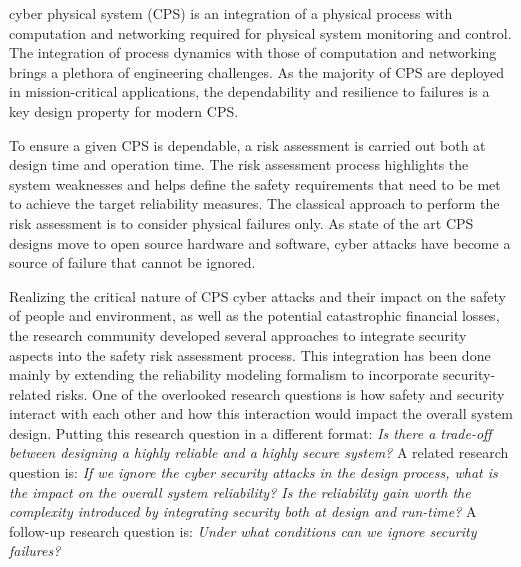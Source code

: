 \documentclass[journal]{IEEEtran}
\begin{document}
% 
% 
% 
% 
 cyber physical system (CPS) is an integration of a physical process with computation and networking required for physical system monitoring and control. The integration of process dynamics with those of computation and networking brings a plethora of engineering challenges. As the majority of CPS are deployed in mission-critical applications, the dependability and resilience to failures is a key design property for modern CPS.

To ensure a given CPS is dependable, a risk assessment is carried out both at design time and operation time. The risk assessment process highlights the system weaknesses and helps define the safety requirements that need to be met to achieve the target reliability measures. The classical approach to perform the risk assessment is to consider physical failures only. As state of the art CPS designs move to open source hardware and software, cyber attacks have become a source of failure that cannot be ignored.

Realizing the critical nature of CPS cyber attacks and their impact on the safety of people and environment, as well as the potential catastrophic financial losses, the research community developed several approaches to integrate security aspects into the safety risk assessment process. This integration has been done mainly by extending the reliability modeling formalism to incorporate security-related risks. One of the overlooked research questions is how safety and security interact with each other and how this interaction would impact the overall system design. Putting this research question in a different format: \textit{Is there a trade-off between designing a highly reliable and a highly secure system?} A related research question is: \textit{If we ignore the cyber security attacks in the design process, what is the impact on the overall system reliability? Is the reliability gain worth the complexity introduced by integrating security both at design and run-time?} A follow-up research question is: \textit{Under what conditions can we ignore security failures?}
\end{document}
